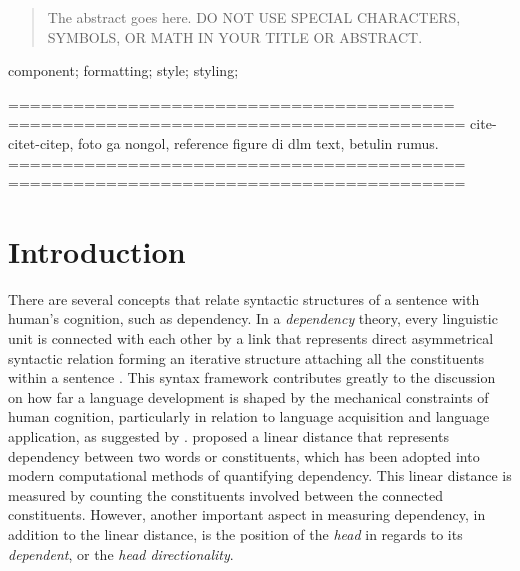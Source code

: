 \documentclass[10pt, a4paper, conference, compsocconf]{IEEEtran}
\begin{document}
\maketitle


\begin{abstract}
The abstract goes here. DO NOT USE SPECIAL CHARACTERS, SYMBOLS, OR MATH IN YOUR TITLE OR ABSTRACT.

\end{abstract}

\begin{IEEEkeywords}
component; formatting; style; styling;

\end{IEEEkeywords}


%
\IEEEpeerreviewmaketitle

=========================================
==========================================
cite-citet-citep, foto ga nongol, reference figure di dlm text, betulin rumus.
==========================================
==========================================

\section{Introduction}

There are several concepts that relate syntactic structures of a sentence with human's cognition, such as dependency. In a \textit{dependency} theory, every linguistic unit is connected with each other by a link that represents direct asymmetrical syntactic relation forming an iterative structure attaching all the constituents within a sentence \citep{tesniere1959elements}. This syntax framework contributes greatly to the discussion on how far a language development is shaped by the mechanical constraints of human cognition, particularly in relation to language acquisition and language application, as suggested by \cite{plotkin2000language}. \cite{heringer1993dependency} proposed a linear distance that represents dependency between two words or constituents, which has been adopted into modern computational methods of quantifying dependency. This linear distance is measured by counting the constituents involved between the connected constituents. However, another important aspect in measuring dependency, in addition to the linear distance, is the position of the \textit{head} in regards to its \textit{dependent}, or the \textit{head directionality}. 
\end{document}
